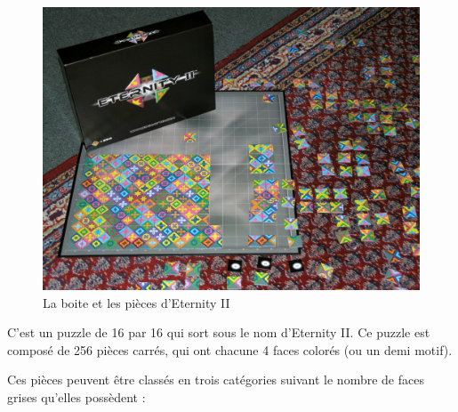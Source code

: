 	\begin{figure}[H]
		\includegraphics[width=\linewidth]{images/eternity_2.jpg}
		\caption{La boite et les pièces d'Eternity II}
		\label{fig:eternity_2}
	\end{figure}
	
	C'est un puzzle de 16 par 16 qui sort sous le nom d'Eternity II. Ce puzzle est composé de 256 pièces carrés, qui ont chacune 4 faces colorés (ou un demi motif).
	
	Ces pièces peuvent être classés en trois catégories suivant le nombre de faces grises qu'elles possèdent :
	
